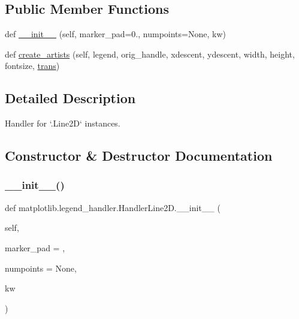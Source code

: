 \subsection*{Public Member Functions}
\begin{DoxyCompactItemize}
\item 
def \hyperlink{classmatplotlib_1_1legend__handler_1_1HandlerLine2D_a24b1c2653b202fb1045ff856d06c6a43}{\+\_\+\+\_\+init\+\_\+\+\_\+} (self, marker\+\_\+pad=0., numpoints=None, kw)
\item 
def \hyperlink{classmatplotlib_1_1legend__handler_1_1HandlerLine2D_a999bdbbf7275b4a6225f70f989bf4d56}{create\+\_\+artists} (self, legend, orig\+\_\+handle, xdescent, ydescent, width, height, fontsize, \hyperlink{size_2foo_8f90_afabfd8da71309850231a00e53c61f106}{trans})
\end{DoxyCompactItemize}


\subsection{Detailed Description}
\begin{DoxyVerb}Handler for `.Line2D` instances.
\end{DoxyVerb}
 

\subsection{Constructor \& Destructor Documentation}
\mbox{\label{classmatplotlib_1_1legend__handler_1_1HandlerLine2D_a24b1c2653b202fb1045ff856d06c6a43}} 
\subsubsection{\texorpdfstring{\+\_\+\+\_\+init\+\_\+\+\_\+()}{\_\_init\_\_()}}
{\footnotesize\ttfamily def matplotlib.\+legend\+\_\+handler.\+Handler\+Line2\+D.\+\_\+\+\_\+init\+\_\+\+\_\+ (\begin{DoxyParamCaption}\item[{}]{self,  }\item[{}]{marker\+\_\+pad = {},  }\item[{}]{numpoints = {\ttfamily None},  }\item[{}]{kw }\end{DoxyParamCaption})}

